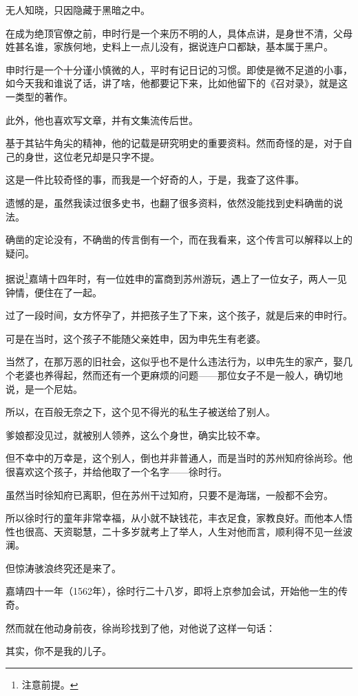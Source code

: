 \begin{multicols}{\theparacolNo}
		无人知晓，只因隐藏于黑暗之中。

		在成为绝顶官僚之前，申时行是一个来历不明的人，具体点讲，是身世不清，父母姓甚名谁，家族何地，史料上一点儿没有，据说连户口都缺，基本属于黑户。

		申时行是一个十分谨小慎微的人，平时有记日记的习惯。即使是微不足道的小事，如今天我和谁说了话，讲了啥，他都要记下来，比如他留下的《召对录》，就是这一类型的著作。

		此外，他也喜欢写文章，并有文集流传后世。

		基于其钻牛角尖的精神，他的记载是研究明史的重要资料。然而奇怪的是，对于自己的身世，这位老兄却是只字不提。

		这是一件比较奇怪的事，而我是一个好奇的人，于是，我查了这件事。

		遗憾的是，虽然我读过很多史书，也翻了很多资料，依然没能找到史料确凿的说法。

		确凿的定论没有，不确凿的传言倒有一个，而在我看来，这个传言可以解释以上的疑问。

		据说\footnote{注意前提。}嘉靖十四年时，有一位姓申的富商到苏州游玩，遇上了一位女子，两人一见钟情，便住在了一起。

		过了一段时间，女方怀孕了，并把孩子生了下来，这个孩子，就是后来的申时行。

		可是在当时，这个孩子不能随父亲姓申，因为申先生有老婆。

		当然了，在那万恶的旧社会，这似乎也不是什么违法行为，以申先生的家产，娶几个老婆也养得起，然而还有一个更麻烦的问题——那位女子不是一般人，确切地说，是一个尼姑。

		所以，在百般无奈之下，这个见不得光的私生子被送给了别人。

		爹娘都没见过，就被别人领养，这么个身世，确实比较不幸。

		但不幸中的万幸是，这个别人，倒也并非普通人，而是当时的苏州知府徐尚珍。他很喜欢这个孩子，并给他取了一个名字——徐时行。

		虽然当时徐知府已离职，但在苏州干过知府，只要不是海瑞，一般都不会穷。

		所以徐时行的童年非常幸福，从小就不缺钱花，丰衣足食，家教良好。而他本人悟性也很高、天资聪慧，二十多岁就考上了举人，人生对他而言，顺利得不见一丝波澜。

		但惊涛骇浪终究还是来了。

		嘉靖四十一年（1562年），徐时行二十八岁，即将上京参加会试，开始他一生的传奇。

		然而就在他动身前夜，徐尚珍找到了他，对他说了这样一句话：

		其实，你不是我的儿子。


\end{multicols}
